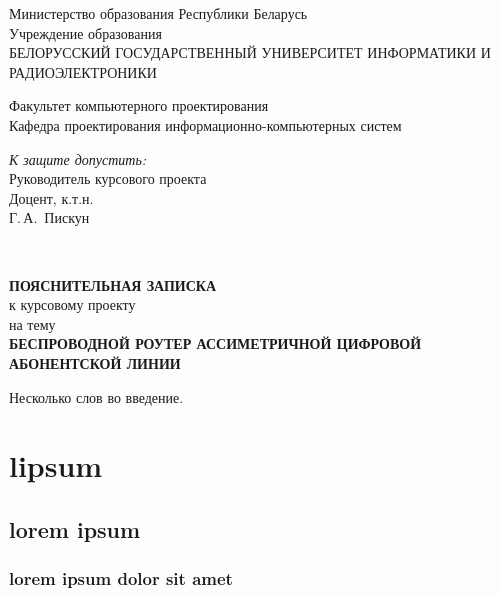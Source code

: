 \documentclass[a4paper,emptystyle]{bsuir-std}
\begin{document}
\begin{titlepage}
\begin{center}
Министерство образования Республики Беларусь\\[1.2em]
Учреждение образования\\[0.4em]
БЕЛОРУССКИЙ ГОСУДАРСТВЕННЫЙ УНИВЕРСИТЕТ ИНФОРМАТИКИ И РАДИОЭЛЕКТРОНИКИ\\[2.0em]
\end{center}
Факультет компьютерного проектирования\\
Кафедра проектирования информационно-компьютерных систем

\begin{flushright}
  \begin{minipage}{0.5\textwidth}
    \textit{К защите допустить:}\\
    Руководитель курсового проекта\\
    Доцент, к.т.н.\\
    \underline{\hspace*{2.8cm}} Г.\,А.~Пискун
  \end{minipage}\\[2em]
\end{flushright}

\begin{center}
  \textbf{ПОЯСНИТЕЛЬНАЯ ЗАПИСКА}\\
  к курсовому проекту\\
  на тему\\[2.0em]

  \textbf{БЕСПРОВОДНОЙ РОУТЕР АССИМЕТРИЧНОЙ ЦИФРОВОЙ АБОНЕНТСКОЙ ЛИНИИ}\\
\end{center}
\end{titlepage}
Несколько слов во введение.
\section{lipsum}
\subsection{lorem ipsum}
\subsubsection{lorem ipsum dolor sit amet}
\lipsum[1]
\end{document}
